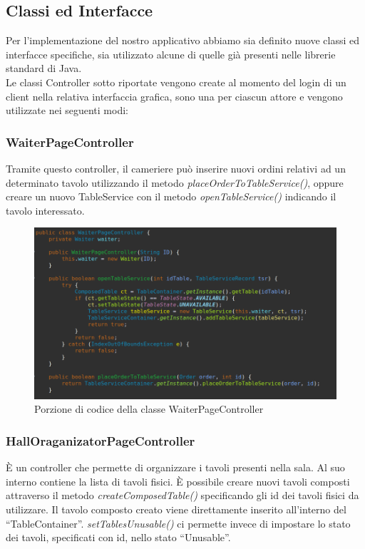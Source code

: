 \documentclass{article}
\begin{document}
\newpage

\subsection{Classi ed Interfacce}
Per l'implementazione del nostro applicativo abbiamo sia definito nuove classi ed interfacce specifiche, sia utilizzato alcune di quelle gi\`a presenti nelle librerie standard di Java. \\
Le classi Controller sotto riportate vengono create al momento del login di un client nella relativa interfaccia grafica, sono una per ciascun attore e vengono utilizzate nei seguenti modi: 

\subsubsection{WaiterPageController}

Tramite questo controller, il cameriere pu\`o inserire nuovi ordini relativi ad un determinato tavolo utilizzando il metodo \textit{placeOrderToTableService()}, oppure creare un nuovo TableService con il metodo \textit{openTableService()} indicando il tavolo interessato.

\begin{figure}[!h]
\centering
\includegraphics[width= 12cm]{"Codice/WaiterPageController.PNG"}
\caption{Porzione di codice della classe WaiterPageController}
\end{figure}


\subsubsection{HallOraganizatorPageController}

\`E un controller che permette di organizzare i tavoli presenti nella sala. Al suo interno contiene la lista di tavoli fisici. \`E possibile creare nuovi tavoli composti attraverso il metodo  \textit{createComposedTable()} specificando gli id dei tavoli fisici da utilizzare. Il tavolo composto creato viene direttamente inserito all'interno del ``TableContainer''.
\textit{setTablesUnusable()} ci permette invece di impostare lo stato dei tavoli, specificati con id, nello stato ``Unusable''.
\end{document}
